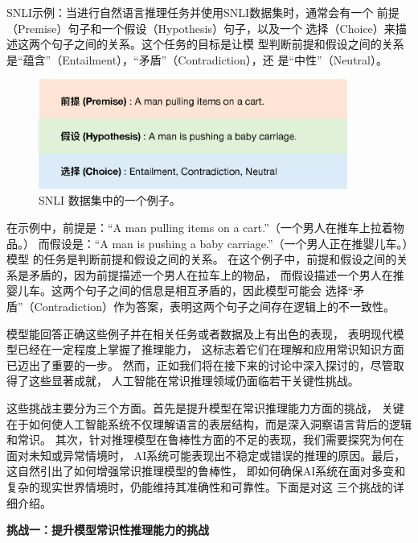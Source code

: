 SNLI示例：当进行自然语言推理任务并使用SNLI\cite{bowman2015large}数据集时，通常会有一个
前提（Premise）句子和一个假设（Hypothesis）句子，以及一个
选择（Choice）来描述这两个句子之间的关系。这个任务的目标是让模
型判断前提和假设之间的关系是``蕴含''（Entailment），``矛盾''（Contradiction），还
是``中性''（Neutral）。


\begin{figure}[th]
  \centering\includegraphics[width=4in]{figures/xulun/snliexample.eps}
  \caption{SNLI 数据集中的一个例子。}
  \label{fig1:snliexample}
  \end{figure}

在示例中，前提是：``A man pulling items on a cart.''（一个男人在推车上拉着物品。）
而假设是：``A man is pushing a baby carriage.''（一个男人正在推婴儿车。）模型
的任务是判断前提和假设之间的关系。
在这个例子中，前提和假设之间的关系是矛盾的，因为前提描述一个男人在拉车上的物品，
而假设描述一个男人在推婴儿车。这两个句子之间的信息是相互矛盾的，因此模型可能会
选择``矛盾''（Contradiction）作为答案，表明这两个句子之间存在逻辑上的不一致性。

模型能回答正确这些例子并在相关任务或者数据及上有出色的表现，
表明现代模型已经在一定程度上掌握了推理能力，
这标志着它们在理解和应用常识知识方面已迈出了重要的一步。
然而，正如我们将在接下来的讨论中深入探讨的，尽管取得了这些显著成就，
人工智能在常识推理领域仍面临若干关键性挑战。

这些挑战主要分为三个方面。首先是提升模型在常识推理能力方面的挑战，
关键在于如何使人工智能系统不仅理解语言的表层结构，而是深入洞察语言背后的逻辑和常识。
其次，针对推理模型在鲁棒性方面的不足的表现，我们需要探究为何在面对未知或异常情境时，
AI系统可能表现出不稳定或错误的推理的原因。最后，这自然引出了如何增强常识推理模型的鲁棒性，
即如何确保AI系统在面对多变和复杂的现实世界情境时，仍能维持其准确性和可靠性。下面是对这
三个挑战的详细介绍。

\textbf{挑战一：提升模型常识性推理能力的挑战}

